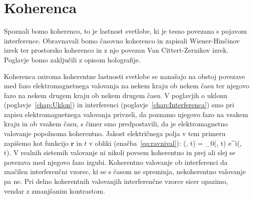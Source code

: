 
\chapter{Koherenca}
\label{chap:Koherenca}
Spoznali bomo koherenco, to je lastnost svetlobe, ki je tesno povezana
s pojavom interference. Obravnavali bomo časovno koherenco in zapisali 
Wiener-Hinčinov izrek ter prostorsko koherenco in z njo povezan 
Van Cittert-Zernikov izrek. Poglavje bomo zaključili z opisom holografije.

Koherenca oziroma koherentne lastnosti svetlobe se nanašajo na obstoj povezave
med fazo elektromagnetnega valovanja na nekem kraju ob nekem času ter njegovo 
fazo na nekem drugem kraju ob nekem drugem času. V poglavjih o 
uklonu (poglavje~\ref{chap:Uklon}) in interferenci (poglavje~\ref{chap:Interferenca})
smo pri zapisu elektromagnetnega valovanja privzeli, da poznamo njegovo fazo 
na vsakem kraju in ob vsakem času, s čimer smo predpostavili, 
da je elektromagnetno valovanje popolnoma koherentno. Jakost
električnega polja v tem primeru zapišemo kot funkcijo $\mathbf{r}$ in $t$ 
v obliki (enačba~\ref{eq:ravnival}):
\beq
{} (, t) = _0(, t) 
e^{i\phi(, t)}.
\eeq
V realnih sistemih valovanje
ni nikoli povsem koherentno in prej ali slej se povezava med njegovo 
fazo izgubi. Koherentno valovanje ob interferenci da značilen interferenčni 
vzorec, ki se s časom ne spreminja, nekoherentno valovanje pa ne. Pri  
delno koherentnih valovanjih interferenčne vzorce sicer opazimo, vendar z zmanjšanim
kontrastom. 

